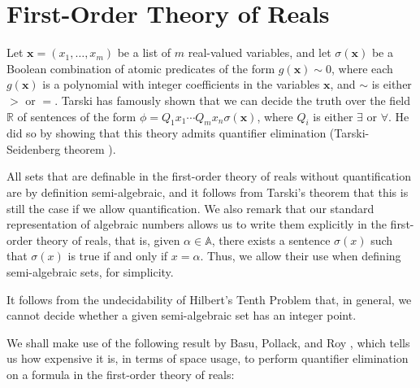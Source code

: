 \section{First-Order Theory of Reals}

Let $\boldsymbol{x}=(x_1,\ldots,x_m)$ be a list of $m$ real-valued
variables, and let $\sigma(\boldsymbol{x})$ be a Boolean combination
of atomic predicates of the form $g(\boldsymbol{x})\sim 0$, where each
$g(\boldsymbol{x})$ is a polynomial with integer coefficients in the
variables $\boldsymbol{x}$, and $\sim$ is either $>$ or $=$. Tarski
has famously shown that we can decide the truth over the field
$\mathbb{R}$ of sentences of the form $\phi=Q_1 x_1 \cdots Q_m x_n
\sigma(\boldsymbol{x})$, where $Q_i$ is either $\exists$ or
$\forall$. He did so by showing that this theory admits quantifier
elimination (Tarski-Seidenberg theorem \cite{Tar51}).


All sets that are definable in the first-order theory of reals without
quantification are by definition semi-algebraic, and it follows from
Tarski's theorem that this is still the case if we allow
quantification. We also remark that our standard representation of
algebraic numbers allows us to write them explicitly in the
first-order theory of reals, that is, given $\alpha\in\mathbb{A}$,
there exists a sentence $\sigma(x)$ such that $\sigma(x)$ is true if
and only if $x=\alpha$. Thus, we allow their use when defining
semi-algebraic sets, for simplicity.

It follows from the undecidability of Hilbert's Tenth Problem that, in
general, we cannot decide whether a given semi-algebraic set has an
integer point.

We shall make use of the following result by Basu, Pollack, and Roy
\cite{BasuPR96}, which tells us how expensive it is, in terms of space
usage, to perform quantifier elimination on a formula in the
first-order theory of reals:

